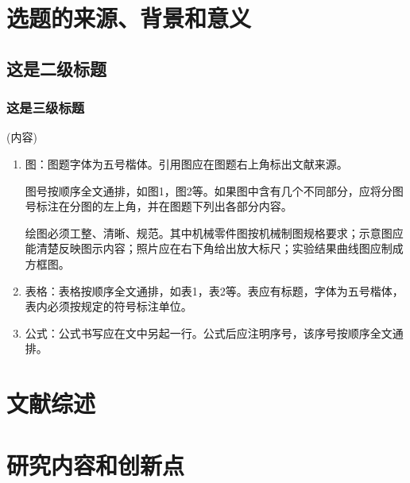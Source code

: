 \documentclass{suesreport}
\begin{document}
    \pagestyle{empty}
    \makecover
    \begin{abstract}
        (摘要内容)摘要部分要求是：宋体，五号，1.25倍行间距，首行缩进2字符，500字左右。

        关键词部分，宋体，五号，关键词数量4-6个，用逗号分隔，末尾不打标点符号

    \end{abstract}
    \begin{center}
        \heiti{}

        \wuhao\qquad
    \end{center}
    \section{选题的来源、背景和意义}
    \subsection{这是二级标题}
    \subsubsection{这是三级标题}
     (内容)

     \begin{enumerate}[label=\arabic*. ]
        \item 图：图题字体为五号楷体。引用图应在图题右上角标出文献来源。
        
        图号按顺序全文通排，如图1，图2等。如果图中含有几个不同部分，应将分图号标注在分图的左上角，并在图题下列出各部分内容。
        
        绘图必须工整、清晰、规范。其中机械零件图按机械制图规格要求；示意图应能清楚反映图示内容；照片应在右下角给出放大标尺；实验结果曲线图应制成方框图。
        \item 表格：表格按顺序全文通排，如表1，表2等。表应有标题，字体为五号楷体，表内必须按规定的符号标注单位。
        \item 公式：公式书写应在文中另起一行。公式后应注明序号，该序号按顺序全文通排。
     \end{enumerate}
    \section{文献综述}
    \section{研究内容和创新点}
\end{document}
